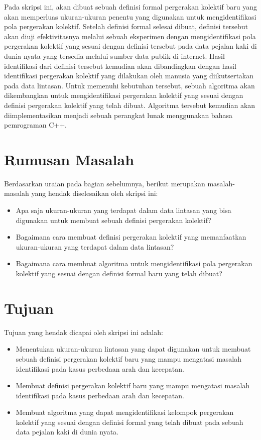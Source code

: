\documentclass[a4paper,twoside]{article}
\begin{document}
Pada skripsi ini, akan dibuat sebuah definisi formal pergerakan kolektif baru yang akan memperluas ukuran-ukuran penentu yang digunakan untuk mengidentifikasi pola pergerakan kolektif. Setelah definisi formal selesai dibuat, definisi tersebut akan diuji efektivitasnya melalui sebuah eksperimen dengan mengidentifikasi pola pergerakan kolektif yang sesuai dengan definisi tersebut pada data pejalan kaki di dunia nyata yang tersedia melalui sumber data publik di internet. Hasil identifikasi dari definisi tersebut kemudian akan dibandingkan dengan hasil identifikasi pergerakan kolektif yang dilakukan oleh manusia yang diikutsertakan pada data lintasan. Untuk memenuhi kebutuhan tersebut, sebuah algoritma akan dikembangkan untuk mengidentifikasi pergerakan kolektif yang sesuai dengan definisi pergerakan kolektif yang telah dibuat. Algoritma tersebut kemudian akan diimplementasikan menjadi sebuah perangkat lunak menggunakan bahasa pemrograman C++.

\section{Rumusan Masalah}

Berdasarkan uraian pada bagian sebelumnya, berikut merupakan masalah-masalah yang hendak diselesaikan oleh skripsi ini:

\begin{itemize}[noitemsep, nolistsep]
    \item Apa saja ukuran-ukuran yang terdapat dalam data lintasan yang bisa digunakan untuk membuat sebuah definisi pergerakan kolektif?
    \item Bagaimana cara membuat definisi pergerakan kolektif yang memanfaatkan ukuran-ukuran yang terdapat dalam data lintasan?
    \item Bagaimana cara membuat algoritma untuk mengidentifikasi pola pergerakan kolektif yang sesuai dengan definisi formal baru yang telah dibuat?
\end{itemize}

\section{Tujuan}

Tujuan yang hendak dicapai oleh skripsi ini adalah:

\begin{itemize}[nolistsep, noitemsep]
    \item Menentukan ukuran-ukuran lintasan yang dapat digunakan untuk membuat sebuah definisi pergerakan kolektif baru yang mampu mengatasi masalah identifikasi pada kasus perbedaan arah dan kecepatan.
    \item Membuat definisi pergerakan kolektif baru yang mampu mengatasi masalah identifikasi pada kasus perbedaan arah dan kecepatan.
    \item Membuat algoritma yang dapat mengidentifikasi kelompok pergerakan kolektif yang sesuai dengan definisi formal yang telah dibuat pada sebuah data pejalan kaki di dunia nyata.
\end{itemize}
\end{document}
